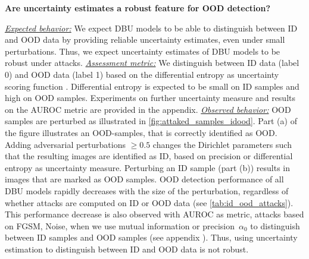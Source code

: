 \begin{center}
	\textbf{Are uncertainty estimates a robust feature for OOD detection?}	
\end{center}
\underline{\emph{Expected behavior:}} We expect DBU models to be able to distinguish between ID and OOD data by providing reliable uncertainty estimates, even under small perturbations. Thus, we expect uncertainty estimates of DBU models to be robust under attacks. 
%
\underline{\emph{Assessment metric:}} We distinguish between ID data (label 0) and OOD data (label 1) based on the differential entropy as uncertainty scoring function \citep{malini2018}. Differential entropy is expected to be small on ID samples and high on OOD samples. Experiments on further uncertainty measure and results on the AUROC metric are provided in the appendix. 
%
\underline{\emph{Observed behavior:}} OOD samples are perturbed as illustrated in  \cref{fig:attaked_samples_idood}. Part (a) of the figure illustrates an OOD-samples, that is correctly identified as OOD. Adding adversarial perturbations $\geq 0.5$ changes the Dirichlet parameters such that the resulting images are identified as ID, based on precision or differential entropy as uncertainty measure. Perturbing an ID sample (part (b)) results in images that are marked as OOD samples. 
OOD detection performance of all DBU models rapidly decreases with the size of the perturbation, regardless of whether attacks are computed on ID or OOD data (see \cref{tab:id_ood_attacks}). This performance decrease is also observed with AUROC as metric, attacks based on FGSM, Noise, when we use mutual information or precision~$\alpha_0$ to distinguish between ID samples and OOD samples (see appendix ). 
Thus, using uncertainty estimation to distinguish between ID and OOD data is not robust. 



